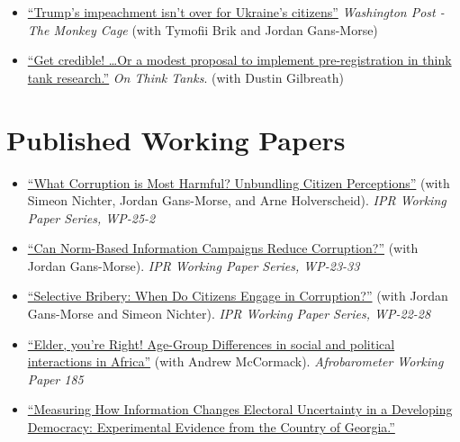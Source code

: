 \documentclass[margin,line]{res}
\begin{document}
\begin{itemize}[label={--}]
\item \href{https://www.washingtonpost.com/politics/2020/02/19/trumps-impeachment-isnt-over-ukraines-citizens/}{``Trump's impeachment isn't over for Ukraine's citizens''} \emph{Washington Post - The Monkey Cage} (with Tymofii Brik and Jordan Gans-Morse)

\item \href{https://onthinktanks.org/articles/get-credible-or-a-modest-proposal-to-implement-pre-registration-in-think-tank-research/}{``Get credible! …Or a modest proposal to implement pre-registration in think tank research.''} \emph{On Think Tanks}. (with Dustin Gilbreath)
\end{itemize}


\section{\sc Published Working Papers }

\begin{itemize}[label={--}]

\item \href{https://www.ipr.northwestern.edu/documents/working-papers/2025/wp-25-2.pdf}{``What Corruption is Most Harmful? Unbundling Citizen Perceptions''} (with Simeon Nichter, Jordan Gans-Morse, and Arne Holverscheid). \textit{IPR Working Paper Series, WP-25-2}

\item \href{https://www.econstor.eu/bitstream/10419/280691/1/I4R-DP094.pdf}{``Can Norm-Based Information Campaigns Reduce Corruption?''} (with Jordan Gans-Morse). \textit{IPR Working Paper Series, WP-23-33}

\item \href{https://www.ipr.northwestern.edu/documents/working-papers/2022/wp-22-28.pdf}{``Selective Bribery: When Do Citizens Engage in Corruption?''} (with Jordan Gans-Morse and Simeon Nichter). \textit{IPR Working Paper Series, WP-22-28}

\item \href{http://afrobarometer.org/publications/wp185-age-group-differences-social-and-political-interactions-africa}{``Elder, you're Right! Age-Group Differences in social and political interactions in Africa''} (with Andrew McCormack). \textit{Afrobarometer Working Paper 185}

\item \href{https://osf.io/mwg7u/}{``Measuring How Information Changes Electoral Uncertainty in a Developing Democracy: Experimental Evidence from the Country of Georgia.''}

\end{itemize}
\end{document}
